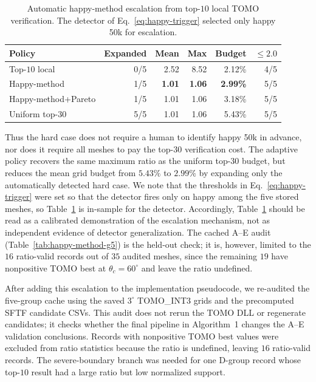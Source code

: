 \documentclass[11pt,a4paper]{article}
\begin{document}
\begin{table}[H]
\centering
\caption{Automatic happy-method escalation from top-$10$ local TOMO verification.
The detector of Eq.~\eqref{eq:happy-trigger} selected only happy 50k for escalation.}
\label{tab:happy-method}
\small
\begin{tabular}{lrrrrr}
\toprule
Policy & Expanded & Mean & Max & Budget & $\le 2.0$\\
\midrule
Top-$10$ local & 0/5 & 2.52 & 8.52 & 2.12\% & 4/5\\
Happy-method & 1/5 & \textbf{1.01} & \textbf{1.06} & \textbf{2.99\%} & 5/5\\
Happy-method+Pareto & 1/5 & 1.01 & 1.06 & 3.18\% & 5/5\\
Uniform top-$30$ & 5/5 & 1.01 & 1.06 & 5.43\% & 5/5\\
\bottomrule
\end{tabular}
\end{table}

Thus the hard case does not require a human to identify happy 50k in advance,
nor does it require all meshes to pay the top-$30$ verification cost.
The adaptive policy recovers the same maximum ratio as the uniform top-$30$ budget,
but reduces the mean grid budget from $5.43\%$ to $2.99\%$ by expanding only the automatically detected hard case.
We note that the thresholds in Eq.~\eqref{eq:happy-trigger} were set so that the detector fires only on happy among
the five stored meshes, so Table~\ref{tab:happy-method} is in-sample for the detector.
Accordingly, Table~\ref{tab:happy-method} should be read as a calibrated demonstration of the escalation mechanism,
not as independent evidence of detector generalization.
The cached A--E audit (Table~\ref{tab:happy-method-g5}) is the held-out check; it is, however, limited to the $16$ ratio-valid records out of $35$ audited meshes,
since the remaining $19$ have nonpositive TOMO best at $\theta_c=60^\circ$ and leave the ratio undefined.

After adding this escalation to the implementation pseudocode, we re-audited the five-group cache using the saved $3^\circ$ TOMO\_INT3 grids and the precomputed SFTF candidate CSVs.
This audit does not rerun the TOMO DLL or regenerate candidates; it checks whether the final pipeline in Algorithm~1 changes the A--E validation conclusions.
Records with nonpositive TOMO best values were excluded from ratio statistics because the ratio is undefined, leaving $16$ ratio-valid records.
The severe-boundary branch was needed for one D-group record whose top-$10$ result had a large ratio but low normalized support.
\end{document}
